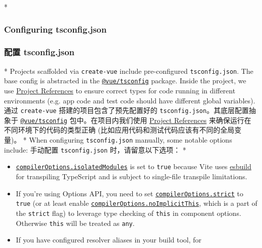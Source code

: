 \begin{paracol}{2} 
 
\switchcolumn[0]*%
\subsubsection{Configuring tsconfig.json}
\switchcolumn
\subsubsection{配置 tsconfig.json}
\switchcolumn[0]*%
Projects scaffolded via \texttt{create-vue} include pre-configured
\texttt{tsconfig.json}. The base config is abstracted in the
\href{https://github.com/vuejs/tsconfig}{\texttt{@vue/tsconfig}}
package. Inside the project, we use
\href{https://www.typescriptlang.org/docs/handbook/project-references.html}{Project
References} to ensure correct types for code running in different
environments (e.g. app code and test code should have different global
variables).
\switchcolumn
通过 \texttt{create-vue} 搭建的项目包含了预先配置好的
\texttt{tsconfig.json}。其底层配置抽象于
\href{https://github.com/vuejs/tsconfig}{\texttt{@vue/tsconfig}}
包中。在项目内我们使用
\href{https://www.typescriptlang.org/docs/handbook/project-references.html}{Project
References} 来确保运行在不同环境下的代码的类型正确
(比如应用代码和测试代码应该有不同的全局变量)。
\switchcolumn[0]*%
When configuring \texttt{tsconfig.json} manually, some notable options
include:
\switchcolumn
手动配置 \texttt{tsconfig.json} 时，请留意以下选项：
\switchcolumn[0]*%
\begin{itemize}
\item
  \href{https://www.typescriptlang.org/tsconfig\#isolatedModules}{\texttt{compilerOptions.isolatedModules}}
  is set to \texttt{true} because Vite uses
  \href{https://esbuild.github.io/}{esbuild} for transpiling TypeScript
  and is subject to single-file transpile limitations.
\item
  If you're using Options API, you need to set
  \href{https://www.typescriptlang.org/tsconfig\#strict}{\texttt{compilerOptions.strict}}
  to \texttt{true} (or at least enable
  \href{https://www.typescriptlang.org/tsconfig\#noImplicitThis}{\texttt{compilerOptions.noImplicitThis}},
  which is a part of the \texttt{strict} flag) to leverage type checking
  of \texttt{this} in component options. Otherwise \texttt{this} will be
  treated as \texttt{any}.
\item
  If you have configured resolver aliases in your build tool, for

\end{itemize}
\end{paracol}
